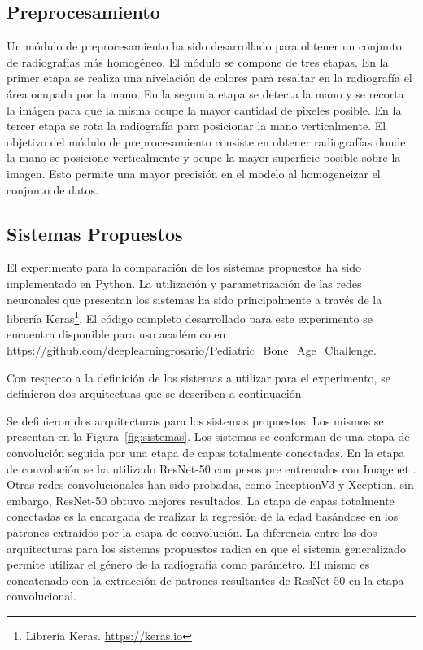 \documentclass[conference]{IEEEtran}
\begin{document}
\subsection{Preprocesamiento}
Un módulo de preprocesamiento ha sido desarrollado para obtener un conjunto de radiografías más homogéneo. El módulo se compone de tres etapas. En la primer etapa se realiza una nivelación de colores para resaltar en la radiografía el área ocupada por la mano. En la segunda etapa se detecta la mano y se recorta la imágen para que la misma ocupe la mayor cantidad de pixeles posible. En la tercer etapa se rota la radiografía para posicionar la mano verticalmente. El objetivo del módulo de preprocesamiento consiste en obtener radiografías donde la mano se posicione verticalmente y ocupe la mayor superficie posible sobre la imagen. Esto permite una mayor precisión en el modelo al homogeneizar el conjunto de datos.

\subsection{Sistemas Propuestos}
El experimento para la comparación de los sistemas propuestos ha sido implementado en Python. La utilización y parametrización de las redes neuronales que presentan los sistemas ha sido principalmente a través de la librería Keras\footnote{Librería Keras. \url{https://keras.io}}. El código completo desarrollado para este experimento se encuentra disponible para uso académico en \url{https://github.com/deeplearningrosario/Pediatric_Bone_Age_Challenge}.

Con respecto a la definición de los sistemas a utilizar para el experimento, se definieron dos arquitectuas que se describen a continuación.

Se definieron dos arquitecturas para los sistemas propuestos. Los mismos se presentan en la Figura~\ref{fig:sistemas}. Los sistemas se conforman de una etapa de convolución seguida por una etapa de capas totalmente conectadas. En la etapa de convolución se ha utilizado ResNet-50 \cite{ResNet} con pesos pre entrenados con Imagenet \cite{Imagenet}. Otras redes convolucionales han sido probadas, como InceptionV3\cite{InceptionV3} y Xception\cite{Xception}, sin embargo, ResNet-50 obtuvo mejores resultados. La etapa de capas totalmente conectadas es la encargada de realizar la regresión de la edad basándose en los patrones extraídos por la etapa de convolución. La diferencia entre las dos arquitecturas para los sistemas propuestos radica en que el sistema generalizado permite utilizar el género de la radiografía como parámetro. El mismo es concatenado con la extracción de patrones resultantes de ResNet-50 en la etapa convolucional.
\end{document}
